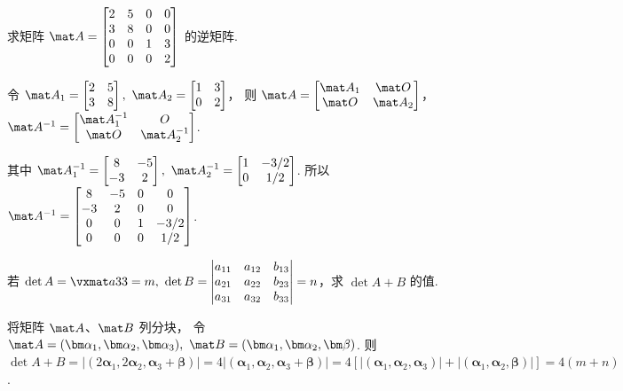 \begin{problem}
  求矩阵 $\mat A =
  \begin{bmatrix}
    2 & 5 & 0 & 0\\
    3 & 8 & 0 & 0\\
    0 & 0 & 1 & 3\\
    0 & 0 & 0 & 2
  \end{bmatrix}$ 的逆矩阵.
\end{problem}
\scratch
\begin{solution}
  令 $\mat A_1 = \begin{bmatrix} 2 & 5\\ 3 & 8\end{bmatrix},~
      \mat A_2 = \begin{bmatrix} 1 & 3\\ 0 & 2\end{bmatrix}$，
  则 $\mat A =
  \begin{bmatrix} \mat A_1 & \mat O\\ \mat O & \mat A_2 \end{bmatrix}$，
  $\mat A^{-1} =
  \begin{bmatrix}
    \mat A_1^{-1} & O\\
    \mat O        & \mat A_2^{-1}
  \end{bmatrix}$.\par\noindent
  其中 $\mat A_1^{-1} =
  \begin{bmatrix} 8 & -5\\ -3 & 2 \end{bmatrix},~
  \mat A_2^{-1} =
  \begin{bmatrix} 1 & -3/2\\ 0 & 1/2 \end{bmatrix}$. 所以 $\mat A^{-1} =
  \begin{bmatrix}
    8  & -5 & 0 & 0\\
    -3 & 2  & 0 & 0\\
    0  & 0  & 1 & -3/2\\
    0  & 0  & 0 & 1/2
  \end{bmatrix}$.
\end{solution}

\begin{problem}
  若 $\det A = \vxmat a33 = m,~
  \det B =
  \begin{vmatrix}
    a_{11} & a_{12} & b_{13}\\
    a_{21} & a_{22} & b_{23}\\
    a_{31} & a_{32} & b_{33}
  \end{vmatrix} = n$，求 $\det{A + B}$ 的值.
\end{problem}
\scratch
\begin{solution}
  将矩阵 $\mat A$、$\mat B$ 列分块，
  令 $\mat A = (\bm\alpha_1, \bm\alpha_2, \bm\alpha_3),~
  \mat B = (\bm\alpha_1, \bm\alpha_2, \bm\beta)$.
  则 $ \det{A + B} = |(2\bm\alpha_1, 2\bm\alpha_2, \bm\alpha_3 + \bm\beta)|
      = 4|(\bm\alpha_1, \bm\alpha_2, \bm\alpha_3 + \bm\beta)|
      = 4[|(\bm\alpha_1, \bm\alpha_2, \bm\alpha_3)|
        + |(\bm\alpha_1, \bm\alpha_2, \bm\beta)|] = 4(m + n)$.
\end{solution}

